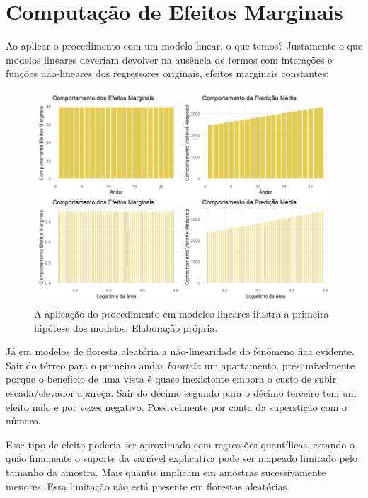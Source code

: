 



\section{Computação de Efeitos Marginais}

Ao aplicar o procedimento com um modelo linear, o que temos? Justamente o que modelos lineares deveriam devolver na ausência de termos com interações e funções não-lineares dos regressores originais, efeitos marginais constantes:

\begin{figure}[H]
    \centering
    \includegraphics[scale = .70]{imagens/efeitos_marginais_lm.png}
    \caption{A aplicação do procedimento em modelos lineares ilustra a primeira hipótese dos modelos. Elaboração própria.}
\end{figure}

Já em modelos de floresta aleatória a não-linearidade do fenômeno fica evidente. Sair do térreo para o primeiro andar \textit{barateia} um apartamento, presumivelmente porque o benefício de uma vista é quase inexistente embora o custo de subir escada/elevador apareça. Sair do décimo segundo para o décimo terceiro tem um efeito nulo e por vezes negativo. Possivelmente por conta da superstição com o número.

Esse tipo de efeito poderia ser aproximado com regressões quantílicas, estando o quão finamente o suporte da variável explicativa pode ser mapeado limitado pelo tamanho da amostra. Mais quantis implicam em amostras sucessivamente menores. Essa limitação não está presente em florestas aleatórias. 

